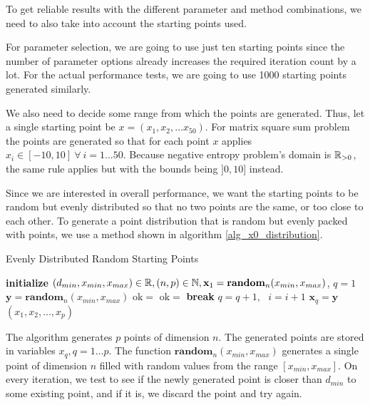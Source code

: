 \documentclass[english, 12pt, a4paper, sci, utf8, a-1b, online, table]{aaltothesis}
\newcommand{\vect}[1]{\ensuremath{\mathbf{#1}}}
\newcommand{\norm}[1]{\ensuremath\Vert #1 \Vert}
\newcommand{\R}{\ensuremath\mathbb{R}}
\newcommand{\N}{\ensuremath\mathbb{N}}
\begin{document}
To get reliable results with the different parameter and method combinations, we need to also take into account the starting points used.

For parameter selection, we are going to use just ten starting points since the number of parameter options already increases the required iteration count by a lot. For the actual performance tests, we are going to use 1000 starting points generated similarly.

We also need to decide some range from which the points are generated. Thus, let a single starting point be $x = (x_1, x_2, \dots x_{50})$. For matrix square sum problem the points are generated so that for each point $x$ applies $x_i \in  [-10, 10]\ \forall\ i = 1 \dots 50$. Because negative entropy problem's domain is $\R_{>0}$, the same rule applies but with the bounds being $]0, 10]$ instead.

Since we are interested in overall performance, we want the starting points to be random but evenly distributed so that no two points are the same, or too close to each other. To generate a point distribution that is random but evenly packed with points, we use a method shown in algorithm \ref{alg_x0_distribution}.

\begin{algorithm}[H]
\caption{Evenly Distributed Random Starting Points}
\label{alg_x0_distribution}
\begin{algorithmic}[1]
\STATE \textbf{initialize} $(d_{min}, x_{min}, x_{max}) \in \R, (n, p) \in \N, \vect{x}_1 = \mathbf{random}_{n}(x_{min}, x_{max})$, $q = 1$
    \STATE $\vect{y} = \mathbf{random}_{n}(x_{min}, x_{max})$
    \STATE $\mathrm{ok} =$ \TRUE
        \IF{$\norm{\vect{x}_j - \vect{y}} < d_{min}$}
            \STATE $\mathrm{ok} = $ \FALSE
            \STATE \textbf{break}
        \ENDIF
    \ENDFOR
        \STATE $q = q + 1$, \ $i = i + 1$
        \STATE $\vect{x}_q = \vect{y}$
    \ENDIF
\ENDWHILE
\RETURN $(x_1, x_2, ..., x_p)$
\end{algorithmic}
\end{algorithm}

The algorithm generates $p$ points of dimension $n$. The generated points are stored in variables $x_q, q = 1 \dots p$. The function $\mathbf{random}_n(x_{min}, x_{max})$ generates a single point of dimension $n$ filled with random values from the range $[x_{min}, x_{max}]$. On every iteration, we test to see if the newly generated point is closer than $d_{min}$ to some existing point, and if it is, we discard the point and try again.
\end{document}
